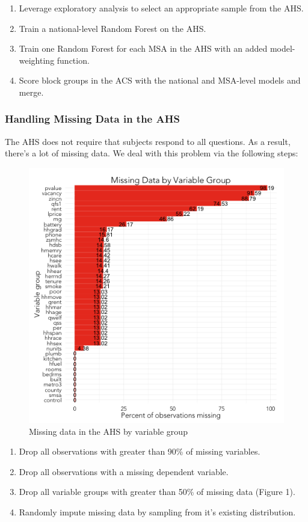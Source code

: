 \documentclass{sig-alternate}
\begin{document}
\begin{enumerate} 
\item Leverage exploratory analysis to select an appropriate sample from the AHS.
\item Train a national-level Random Forest on the AHS.
\item Train one Random Forest for each MSA in the AHS with an added model-weighting function.
\item Score block groups in the ACS with the national and MSA-level models and merge.
\end{enumerate}

\subsubsection{Handling Missing Data in the AHS}

The AHS does not require that subjects respond to all questions. As a result, there's a lot of missing data. We deal with this problem via the following steps:

\begin{figure}
\centering 
\includegraphics[scale=0.42]{missing-data-1.png}
\caption{Missing data in the AHS by variable group} 
\end{figure}

\begin{enumerate} 
\item Drop all observations with greater than 90\% of missing variables. 
\item Drop all observations with a missing dependent variable.
\item Drop all variable groups with greater than 50\% of missing data (Figure 1).
\item Randomly impute missing data by sampling from it's existing distribution.
\end{enumerate}
\end{document}
